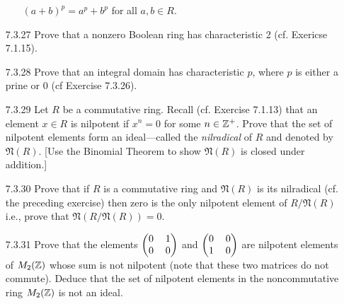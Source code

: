 \begin{enumerate}
\begin{enumerate}
                           $(a + b)^p = a^p + b^p$ for all $a, b \in R$.
                  \end{enumerate}
   \item[7.3.27]  Prove that a nonzero Boolean ring has characteristic 2
                  (cf. Exericse 7.1.15).
   \item[7.3.28]  Prove that an integral domain has characteristic $p$, where
                  $p$ is either a prine or 0 (cf Exercise 7.3.26).
   \item[7.3.29]  Let $R$ be a commutative ring. Recall (cf. Exercise 7.1.13)
                  that an element $x \in R$ is nilpotent if $x^n = 0$ for some
                  $n \in \mathbb{Z}^+$. Prove that the set of nilpotent elements form an 
                  ideal---called the \textit{nilradical} of $R$ and denoted by
                  $\mathfrak{N}(R)$. [Use the Binomial Theorem to show
                  $\mathfrak{N}(R)$ is closed under addition.]
   \item[7.3.30]  Prove that if $R$ is a commutative ring and $\mathfrak{N}(R)$
                  is its nilradical (cf. the preceding exercise) then zero is
                  the only nilpotent element of $R/\mathfrak{N}(R)$ i.e., prove
                  that $\mathfrak{N}(R/\mathfrak{N}(R)) = 0$.
   \item[7.3.31]  Prove that the elements $\left(\begin{tabular}{@{}cc@{}}
                     0 & 1 \\
                     0 & 0
                  \end{tabular}\right)$ and $\left(\begin{tabular}{@{}cc@{}}
                     0 & 0 \\
                     1 & 0
                  \end{tabular}\right)$ are nilpotent elements of $M_2(\mathbb{Z})$
                  whose sum is not nilpotent (note that these two matrices do
                  not commute). Deduce that the set of nilpotent elements in the
                  noncommutative ring $M_2(\mathbb{Z})$ is not an ideal.

\end{enumerate}
